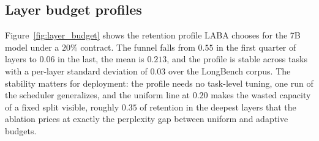 \subsection{Layer budget profiles}\label{sec:exp_profile}

Figure~\ref{fig:layer_budget} shows the retention profile LABA chooses
for the 7B model under a $20\%$ contract. The funnel falls from $0.55$
in the first quarter of layers to $0.06$ in the last, the mean is
$0.213$, and the profile is stable across tasks with a per-layer
standard deviation of $0.03$ over the LongBench corpus. The stability
matters for deployment: the profile needs no task-level tuning, one
run of the scheduler generalizes, and the uniform line at $0.20$ makes
the wasted capacity of a fixed split visible, roughly $0.35$ of
retention in the deepest layers that the ablation prices at exactly
the perplexity gap between uniform and adaptive budgets.
